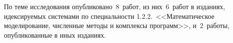 {\begin{refsection}
        По теме исследования опубликовано~8~работ, из них~6~работ в изданиях, идексируемых системами  по специальности 1.2.2.~<<Математическое моделирование, численные методы и комплексы программ>>, и~2~работы, опубликованные в иных изданиях.
        
    \end{refsection}%
    \begin{refsection}

\end{refsection}}
